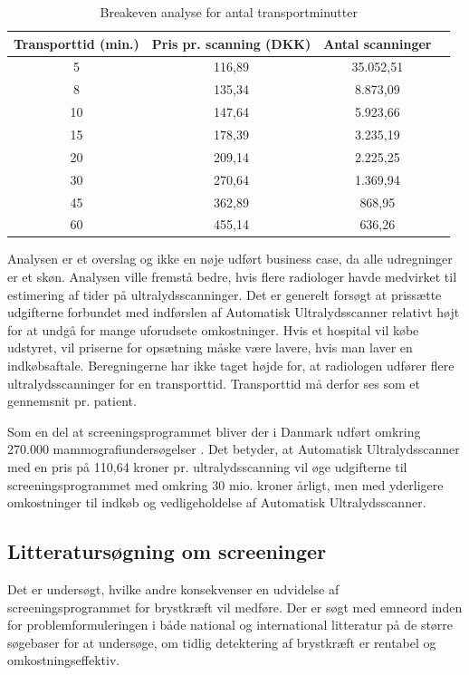 \begin{table}[H]
\centering
\begin{tabular}{ | c | c | c | p{} | }
\hline
\textbf{Transporttid (min.)} & \textbf{Pris pr. scanning (DKK)} & \textbf{Antal scanninger} \\\hline
5 & 116,89 & 35.052,51 \\\hline
8 & 135,34 & 8.873,09\\\hline
10 & 147,64 & 5.923,66\\\hline
15 & 178,39 & 3.235,19 \\\hline
20 & 209,14 & 2.225,25\\\hline
30 & 270,64 & 1.369,94\\\hline
45 & 362,89 & 868,95 \\\hline
60 & 455,14 & 636,26 \\\hline
\end{tabular}
\caption{Breakeven analyse for antal transportminutter}
\label{Breakeven}
\end{table}

Analysen er et overslag og ikke en nøje udført business case, da alle udregninger er et skøn. Analysen ville fremstå bedre, hvis  flere radiologer havde medvirket til estimering af tider på ultralydsscanninger. Det er generelt forsøgt at prissætte udgifterne forbundet med indførslen af Automatisk Ultralydsscanner relativt højt for at undgå for mange uforudsete omkostninger. Hvis et hospital vil købe udstyret, vil priserne for opsætning måske være lavere, hvis man laver en indkøbsaftale. Beregningerne har ikke taget højde for, at radiologen udfører flere ultralydsscanninger for en transporttid. Transporttid må derfor ses som et gennemsnit pr. patient.

Som en del at screeningsprogrammet  bliver der i Danmark udført omkring 270.000 mammografiundersøgelser \cite{esundhed}. Det betyder, at Automatisk Ultralydsscanner med en pris på 110,64 kroner pr. ultralydsscanning vil øge udgifterne til screeningsprogrammet med omkring 30 mio. kroner årligt, men med yderligere omkostninger til indkøb og vedligeholdelse af Automatisk Ultralydsscanner. 

\subsection{Litteratursøgning om screeninger}
Det er undersøgt, hvilke andre konsekvenser en udvidelse af screeningsprogrammet for brystkræft vil medføre. Der er søgt med emneord inden for problemformuleringen i både national og international litteratur på de større søgebaser for at undersøge, om tidlig detektering af brystkræft er rentabel og omkostningseffektiv. 

